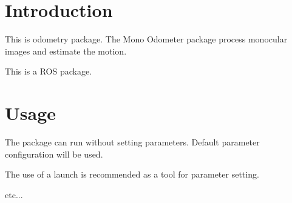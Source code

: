 \hypertarget{index_intro_sec}{}\section{\-Introduction}\label{index_intro_sec}
\-This is odometry package. \-The \-Mono \-Odometer package process monocular images and estimate the motion.

\-This is a \-R\-O\-S package.\hypertarget{index_usage_sec}{}\section{\-Usage}\label{index_usage_sec}
\-The package can run without setting parameters. \-Default parameter configuration will be used.

\-The use of a launch is recommended as a tool for parameter setting.

etc... 